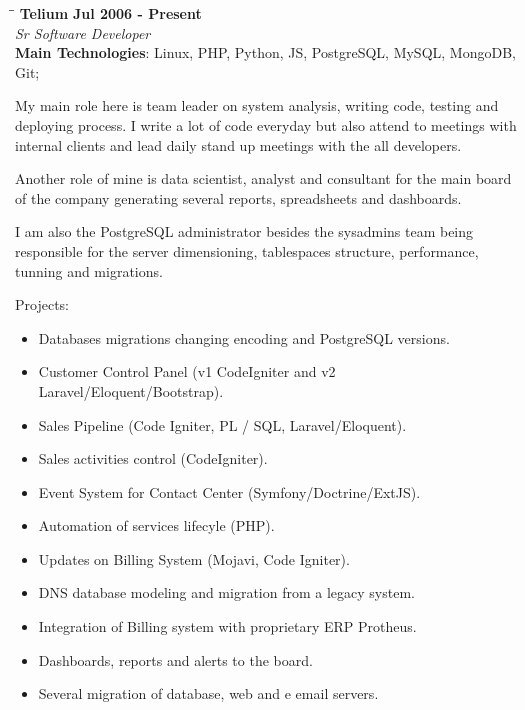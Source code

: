 \documentclass[margin]{res}
\begin{document}
\begin{resume}
\vspace{-0.1in}
   \begin{tabbing}
   \hspace{2.3in}\= \hspace{1.7in}\= \kill %
    \textbf{Telium}    \>\>\textbf{Jul 2006 - Present}\\
    \textit{Sr Software Developer}\\        
    \textbf{Main Technologies}: Linux, PHP, Python, JS, PostgreSQL, MySQL, MongoDB, Git;
   \end{tabbing}\vspace{-20pt}      %
    \vspace{2mm}
    My main role here is team leader on system analysis, writing code, testing and deploying process. I write a lot of code everyday but also attend to meetings with internal clients and lead daily stand up meetings with the all developers.

    Another role of mine is data scientist, analyst and consultant for the main board of the company generating several reports, spreadsheets and dashboards.

    I am also the PostgreSQL administrator besides the sysadmins team being responsible for the server dimensioning, tablespaces structure, performance, tunning and migrations.

    Projects:
    \begin{itemize}
      \item Databases migrations changing encoding and PostgreSQL versions.
      \item Customer Control Panel (v1 CodeIgniter and v2 Laravel/Eloquent/Bootstrap).
      \item Sales Pipeline (Code Igniter, PL / SQL, Laravel/Eloquent).
      \item Sales activities control (CodeIgniter).
      \item Event System for Contact Center (Symfony/Doctrine/ExtJS).
      \item Automation of services lifecyle (PHP).
      \item Updates on Billing System (Mojavi, Code Igniter).
      \item DNS database modeling and migration from a legacy system.
      \item Integration of Billing system with proprietary ERP Protheus.
      \item Dashboards, reports and alerts to the board.
      \item Several migration of database, web and e email servers.
    \end{itemize}


\end{resume}
\end{document}
